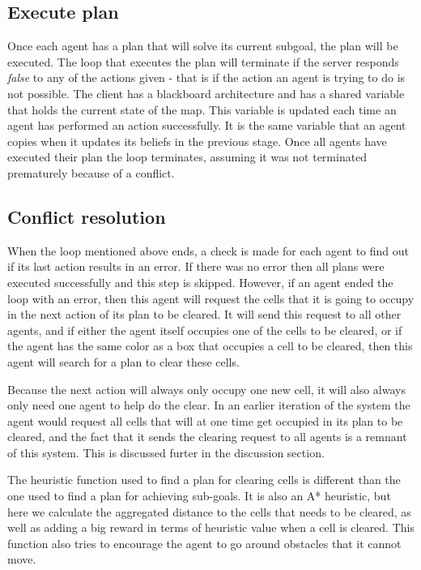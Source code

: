\documentclass[letterpaper]{article}
\begin{document}
\subsection{Execute plan}
Once each agent has a plan that will solve its current subgoal, the plan will be executed. The loop that executes the plan will terminate if the server responds \textit{false} to any of the actions given - that is if the action an agent is trying to do is not possible. The client has a blackboard architecture and has a shared variable that holds the current state of the map. This variable is updated each time an agent has performed an action successfully. It is the same variable that an agent copies when it updates its beliefs in the previous stage. Once all agents have executed their plan the loop terminates, assuming it was not terminated prematurely because of a conflict.

\subsection{Conflict resolution}
When the loop mentioned above ends, a check is made for each agent to find out if its last action results in an error. If there was no error then all plans were executed successfully and this step is skipped. However, if an agent ended the loop with an error, then this agent will request the cells that it is going to occupy in the next action of its plan to be cleared. It will send this request to all other agents, and if either the agent itself occupies one of the cells to be cleared, or if the agent has the same color as a box that occupies a cell to be cleared, then this agent will search for a plan to clear these cells.

Because the next action will always only occupy one new cell, it will also always only need one agent to help do the clear. In an earlier iteration of the system the agent would request all cells that will at one time get occupied in its plan to be cleared, and the fact that it sends the clearing request to all agents is a remnant of this system. This is discussed furter in the discussion section.

The heuristic function used to find a plan for clearing cells is different than the one used to find a plan for achieving sub-goals. It is also an A* heuristic, but here we calculate the aggregated distance to the cells that needs to be cleared, as well as adding a big reward in terms of heuristic value when a cell is cleared. This function also tries to encourage the agent to go around obstacles that it cannot move.
\end{document}
